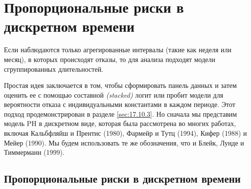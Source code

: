 \section{Пропорциональные риски в дискретном времени}\label{sec:17.10}

\noindent
Если наблюдаются только агрегированные интервалы (такие как неделя или месяц), в которых происходят отказы, то для анализа подходят модели сгруппированных длительностей.

Простая идея заключается в том, чтобы сформировать панель данных и затем оценить ее с помощью составной \textit{(stacked)} логит или пробит модели для вероятности отказа с индивидуальными константами в каждом периоде. Этот подход продемонстрирован в разделе \ref{sec:17.10.3}. Но сначала мы представим модель PH в дискретном виде, которая была рассмотрена во многих работах, включая Кальбфляйш и Прентис (1980), Фармейр и Тутц (1994), Кифер (1988) и Мейер (1990). Мы будем использовать те же обозначения, что и Блейк, Лунде и Тиммерманн (1999).


\subsection{Пропорциональные риски в дискретном времени}\label{sec:17.10.1}

